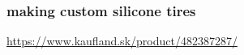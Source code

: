 \documentclass{beamer}
\begin{document}
\begin{frame}
  
  \frametitle{\bf making custom silicone tires}
  \url{https://www.kaufland.sk/product/482387287/}


\end{frame}
\end{document}

